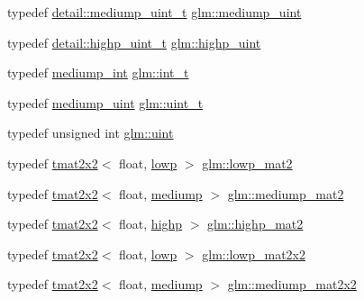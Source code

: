 \begin{DoxyCompactItemize}
\item 
typedef \mbox{\hyperlink{namespaceglm_1_1detail_a98f572e92099cc1b5740f1ccf1c80f8d}{detail\+::mediump\+\_\+uint\+\_\+t}} \mbox{\hyperlink{group__core__precision_ga08ae38ad78ade3539fdd1d25052b8c51}{glm\+::mediump\+\_\+uint}}
\item 
typedef \mbox{\hyperlink{namespaceglm_1_1detail_a994c05c8a976cc902a7cd193ad36bbba}{detail\+::highp\+\_\+uint\+\_\+t}} \mbox{\hyperlink{group__core__precision_gabfd1cf11193324a5f77d3831b6ac3205}{glm\+::highp\+\_\+uint}}
\item 
typedef \mbox{\hyperlink{group__core__precision_ga2a3dcbcd7f4e17663d393a12061ac6ac}{mediump\+\_\+int}} \mbox{\hyperlink{group__core__precision_gacd01d170508f812968875b0f2e730e8c}{glm\+::int\+\_\+t}}
\item 
typedef \mbox{\hyperlink{group__core__precision_ga08ae38ad78ade3539fdd1d25052b8c51}{mediump\+\_\+uint}} \mbox{\hyperlink{group__core__precision_ga5f2ae871c284c9d39ae8fdbb1305b566}{glm\+::uint\+\_\+t}}
\item 
typedef unsigned int \mbox{\hyperlink{group__core__precision_ga4fd29415871152bfb5abd588334147c8}{glm\+::uint}}
\item 
typedef \mbox{\hyperlink{structglm_1_1tmat2x2}{tmat2x2}}$<$ float, \mbox{\hyperlink{namespaceglm_a0f04f086094c747d227af4425893f545ae161af3fc695e696ce3bf69f7332bc2d}{lowp}} $>$ \mbox{\hyperlink{group__core__precision_ga2eb6d28afe554e1a2ebc79e3201e8651}{glm\+::lowp\+\_\+mat2}}
\item 
typedef \mbox{\hyperlink{structglm_1_1tmat2x2}{tmat2x2}}$<$ float, \mbox{\hyperlink{namespaceglm_a0f04f086094c747d227af4425893f545a6416f3ea0c9025fb21ed50c4d6620482}{mediump}} $>$ \mbox{\hyperlink{group__core__precision_ga3b83486a767447bf1b36bbf32e589bac}{glm\+::mediump\+\_\+mat2}}
\item 
typedef \mbox{\hyperlink{structglm_1_1tmat2x2}{tmat2x2}}$<$ float, \mbox{\hyperlink{namespaceglm_a0f04f086094c747d227af4425893f545ac6f7eab42eacbb10d59a58e95e362074}{highp}} $>$ \mbox{\hyperlink{group__core__precision_ga8539ada9351e0a74964fa23c040246cf}{glm\+::highp\+\_\+mat2}}
\item 
typedef \mbox{\hyperlink{structglm_1_1tmat2x2}{tmat2x2}}$<$ float, \mbox{\hyperlink{namespaceglm_a0f04f086094c747d227af4425893f545ae161af3fc695e696ce3bf69f7332bc2d}{lowp}} $>$ \mbox{\hyperlink{group__core__precision_ga764ca10ac431c7306adaf9e134795919}{glm\+::lowp\+\_\+mat2x2}}
\item 
typedef \mbox{\hyperlink{structglm_1_1tmat2x2}{tmat2x2}}$<$ float, \mbox{\hyperlink{namespaceglm_a0f04f086094c747d227af4425893f545a6416f3ea0c9025fb21ed50c4d6620482}{mediump}} $>$ \mbox{\hyperlink{group__core__precision_ga7f27d5d720010e94d8a98eaaaf7f1f32}{glm\+::mediump\+\_\+mat2x2}}

\end{DoxyCompactItemize}

